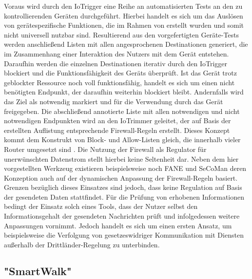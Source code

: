 \noindentIm Voraus wird durch den IoTrigger eine Reihe an automatisierten Tests an den zu kontrollierenden Geräten durchgeführt. Hierbei handelt es sich um das Auslösen von gerätespezifische Funktionen, die im Rahmen von \cite[p. 13-14]{Mandalari2021} erstellt wurden und somit nicht universell nutzbar sind. 
Resultierend aus den vorgefertigten Geräte-Tests werden anschließend Listen mit allen angesprochenen Destinationen generiert, die im Zusammenhang einer Interaktion des Nutzers mit dem Gerät entstehen. Daraufhin werden die einzelnen Destinationen iterativ durch den IoTrigger blockiert und die Funktionsfähigkeit des Geräts überprüft. 
Ist das Gerät trotz geblockter Ressource noch voll funktionsfähig, handelt es sich um einen nicht benötigten Endpunkt, der daraufhin weiterhin blockiert bleibt. Andernfalls wird das Ziel als notwendig markiert und für die Verwendung durch das Gerät freigegeben. 
Die abschließend annotierte Liste mit allen notwendigen und nicht notwendigen Endpunkten wird an den IoTrimmer geleitet, der auf Basis der erstellten Auflistung entsprechende Firewall-Regeln erstellt. Dieses Konzept kommt dem Konstrukt von Block- und Allow-Listen gleich, die innerhalb vieler Router umgesetzt sind \cite{FritzBox2022}.
Die Nutzung der Firewall als Regulator für unerwünschten Datenstrom stellt hierbei keine Seltenheit dar. Neben dem hier vorgestellten Werkzeug existieren beispielsweise noch FANE \cite{Haar2019} und SeCoMan \cite{Huertas2016} deren Konzeption auch auf der dynamischen Anpassung der Firewall-Regeln basiert. Grenzen bezüglich dieses Einsatzes sind jedoch, dass keine Regulation auf Basis der gesendeten Daten stattfindet. 
Für die Prüfung von erhobenen Informationen bedingt der Einsatz solch eines Tools, dass der Nutzer selbst den Informationsgehalt der gesendeten Nachrichten prüft und infolgedessen weitere Anpassungen vornimmt. Jedoch handelt es sich um einen ersten Ansatz, um beispielsweise die Verfolgung von gesetzeswidriger Kommunikation mit Diensten außerhalb der Drittländer-Regelung \cite{dsgvo2016} zu unterbinden.

\subsection{"SmartWalk" \cite{Natix2022}}
\label{sec:Regulationsmöglichkeiten:ssec:SmartWalk}

